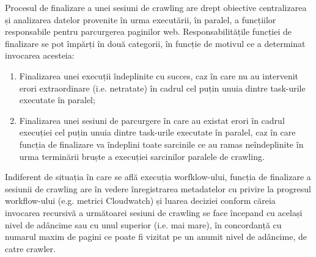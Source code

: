 Procesul de finalizare a unei sesiuni de crawling are drept obiective centralizarea și analizarea datelor provenite în urma executării, în paralel, a funcțiilor responsabile pentru parcurgerea paginilor web. Responsabilitățile funcției de finalizare se pot împărți în două categorii, în funcție de motivul ce a determinat invocarea acesteia:

\begin{enumerate}
	\item{Finalizarea unei execuții îndeplinite cu succes, caz în care nu au intervenit erori extraordinare (i.e. netratate) în cadrul cel puțin unuia dintre task-urile executate în paralel;}
	\item{Finalizarea unei sesiuni de parcurgere în care au existat erori în cadrul execuției cel puțin unuia dintre task-urile executate în paralel, caz în care funcția de finalizare va îndeplini toate sarcinile ce au ramas neîndeplinite în urma terminării bruște a execuției sarcinilor paralele de crawling.}
\end{enumerate} 

\noindent
Indiferent de situația în care se află execuția worfklow-ului, funcția de finalizare a sesiunii de crawling are în vedere înregistrarea metadatelor cu privire la progresul workflow-ului (e.g. metrici Cloudwatch) și luarea deciziei conform căreia invocarea recursivă a următoarei sesiuni de crawling se face începand cu același nivel de adâncime sau cu unul superior (i.e. mai mare), în concordanță cu numarul maxim de pagini ce poate fi vizitat pe un anumit nivel de adâncime, de catre crawler.

